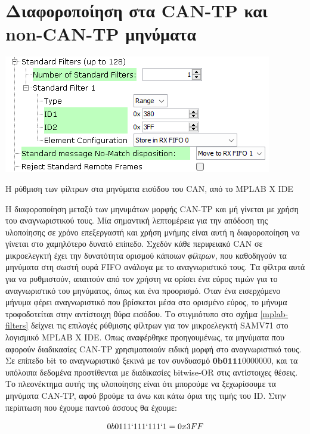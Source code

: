 \documentclass[a4paper,nobib,justified]{tufte-book}
\begin{document}
\section{Διαφοροποίηση στα CAN-TP και non-CAN-TP μηνύματα}
\begin{marginfigure}[H]
	\includegraphics[width=\textwidth]{media/images/mplab-filters.png}
	\label{mplab-filters}
	\caption{Η ρύθμιση των φίλτρων στα μηνύματα εισόδου του CAN, από το MPLAB X IDE}
\end{marginfigure}

Η διαφοροποίηση μεταξύ των μηνυμάτων μορφής CAN-TP και μή γίνεται με χρήση του αναγνωριστικού τους. Μία σημαντική λεπτομέρεια για την απόδοση της υλοποίησης σε χρόνο επεξεργαστή και χρήση μνήμης είναι αυτή η διαφοροποίηση να γίνεται στο χαμηλότερο δυνατό επίπεδο. Σχεδόν κάθε περιφειακό CAN σε μικροελεγκτή έχει την δυνατότητα ορισμού κάποιων \textit{φίλτρων}, που καθοδηγούν τα μηνύματα στη σωστή ουρά FIFO ανάλογα με το αναγνωριστικό τους. Τα φίλτρα αυτά για να ρυθμιστούν, απαιτούν από τον χρήστη να ορίσει ένα εύρος τιμών για το αναγνωριστικό του μηνύματος, όπως και ένα προορισμό. Όταν ένα εισερχόμενο μήνυμα φέρει αναγνωριστικό που βρίσκεται μέσα στο ορισμένο εύρος, το μήνυμα τροφοδοτείται στην αντίστοιχη θύρα εισόδου. Το στιγμιότυπο στο σχήμα \ref{mplab-filters} δείχνει τις επιλογές ρύθμισης φίλτρων για τον μικροελεγκτή SAMV71 στο λογισμικό MPLAB X IDE. Όπως αναφέρθηκε προηγουμένως, τα μηνύματα που αφορούν διαδικασίες CAN-TP χρησιμοποιούν ειδική μορφή στο αναγνωριστικό τους. Σε επίπεδο bit το αναγνωριστικό ξεκινά με τον συνδυασμό $\textbf{0b0111}0000000$, και τα υπόλοιπα δεδομένα προστίθενται με διαδικασίες bitwise-OR στις αντίστοιχες θέσεις. Το πλεονέκτημα αυτής της υλοποίησης είναι ότι μπορούμε να ξεχωρίσουμε τα μηνύματα CAN-TP, αφού βρούμε τα άνω και κάτω όρια της τιμής του ID. Στην περίπτωση που έχουμε παντού άσσους θα έχουμε:

\begin{equation}
0b0111`111`111`1 = 0x3FF
\end{equation}
\end{document}
